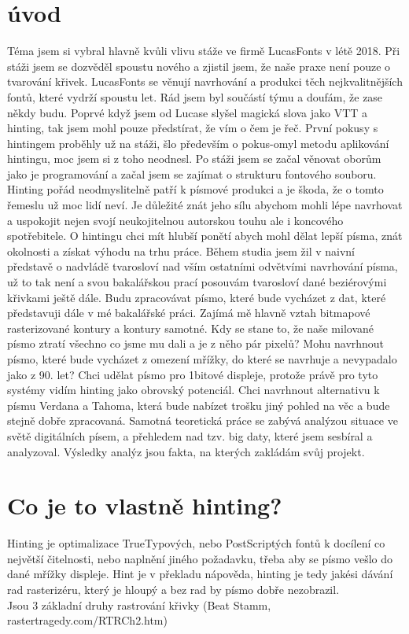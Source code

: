 \documentclass[a4paper]{article}
\begin{document}
\section{úvod}
\setcounter{page}{1}
Téma jsem si vybral hlavně kvůli vlivu stáže ve firmě LucasFonts v létě 2018. Při stáži jsem se dozvěděl spoustu nového a zjistil jsem, že naše praxe není pouze o tvarování křivek. LucasFonts se věnují navrhování a produkci těch nejkvalitnějších fontů, které vydrží spoustu let. Rád jsem byl součástí týmu a doufám, že zase někdy budu. Poprvé když jsem od Lucase slyšel magická slova jako VTT a hinting, tak jsem mohl pouze předstírat, že vím o čem je řeč. První pokusy s hintingem proběhly už na stáži, šlo především o pokus-omyl metodu aplikování hintingu, moc jsem si z toho neodnesl. Po stáži jsem se začal věnovat oborům jako je programování a začal jsem se zajímat o strukturu fontového souboru. Hinting pořád neodmyslitelně patří k písmové produkci a je škoda, že o tomto řemeslu už moc lidí neví. Je důležité znát jeho sílu abychom mohli lépe navrhovat a uspokojit nejen svojí neukojitelnou autorskou touhu ale i koncového spotřebitele. O hintingu chci mít hlubší ponětí abych mohl dělat lepší písma, znát okolnosti a získat výhodu na trhu práce. Během studia jsem žil v naivní představě o nadvládě tvarosloví nad vším ostatními odvětvími navrhování písma, už to tak není a svou bakalářskou prací posouvám tvarosloví dané beziérovými křivkami ještě dále. Budu zpracovávat písmo, které bude vycházet z dat, které představuji dále v mé bakalářské práci. Zajímá mě hlavně vztah bitmapové rasterizované kontury a kontury samotné. Kdy se stane to, že naše milované písmo ztratí všechno co jsme mu dali a je z něho pár pixelů? Mohu navrhnout písmo, které bude vycházet z omezení mřížky, do které se navrhuje a nevypadalo jako z 90. let? Chci udělat písmo pro 1bitové displeje, protože právě pro tyto systémy vidím hinting jako obrovský potenciál. Chci navrhnout alternativu k písmu Verdana a Tahoma, která bude nabízet trošku jiný pohled na věc a bude stejně dobře zpracovaná. Samotná teoretická práce se zabývá analýzou situace ve světě digitálních písem, a přehledem nad tzv. big daty, které jsem sesbíral a analyzoval. Výsledky analýz jsou fakta, na kterých zakládám svůj projekt.

\section{Co je to vlastně hinting?}

Hinting je optimalizace TrueTypových, nebo PostScriptých fontů k docílení co největší čitelnosti, nebo naplnění jiného požadavku, třeba aby se písmo vešlo do dané mřížky displeje. Hint je v překladu nápověda, hinting je tedy jakési dávání rad rasterizéru, který je hloupý a bez rad by písmo dobře nezobrazil. \\
Jsou 3 základní druhy rastrování křivky (Beat Stamm, rastertragedy.com/RTRCh2.htm)
\end{document}
